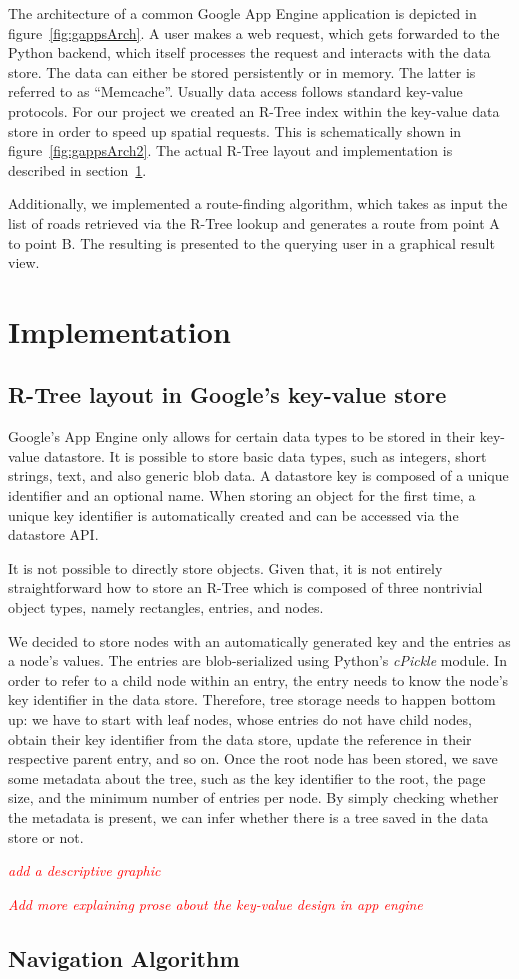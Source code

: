 \documentclass{scrartcl}
\newcommand{\TODO}[1]{\textcolor{red}{\boxed{\mathbf{TODO }} {\textit{#1}} }}
\begin{document}
The architecture of a common Google App Engine application is depicted in figure~\ref{fig:gappsArch}. A user makes a web request, which gets forwarded to the Python backend, which itself processes the request and interacts with the data store. The data can either be stored persistently or in memory. The latter is referred to as ``Memcache''. Usually data access follows standard key-value protocols. For our project we created an R-Tree index within the key-value data store in order to speed up spatial requests. This is schematically shown in figure~\ref{fig:gappsArch2}. The actual R-Tree layout and implementation is described in section~\ref{sec:implementation}.

Additionally, we implemented a route-finding algorithm, which takes as input the list of roads retrieved via the R-Tree lookup and generates a route from point A to point B. The resulting is presented to the querying user in a graphical result view.

\section{Implementation}
\label{sec:implementation}
\subsection{R-Tree layout in Google's key-value store}
Google's App Engine only allows for certain data types to be stored in their key-value datastore. It is possible to store basic data types, such as integers, short strings, text, and also generic blob data. A datastore key is composed of a unique identifier and an optional name. When storing an object for the first time, a unique key identifier is automatically created and can be accessed via the datastore API. 

It is not possible to directly store objects. Given that, it is not entirely straightforward how to store an R-Tree which is composed of three nontrivial object types, namely rectangles, entries, and nodes. 

We decided to store nodes with an automatically generated key and the entries as a node's values. The entries are blob-serialized using Python's \textit{cPickle} module. In order to refer to a child node within an entry, the entry needs to know the node's key identifier in the data store. Therefore, tree storage needs to happen bottom up: we have to start with leaf nodes, whose entries do not have child nodes, obtain their key identifier from the data store, update the reference in their respective parent entry, and so on. Once the root node has been stored, we save some metadata about the tree, such as the key identifier to the root, the page size, and the minimum number of entries per node. By simply checking whether the metadata is present, we can infer whether there is a tree saved in the data store or not.

\TODO{add a descriptive graphic}

\TODO{Add more explaining prose about the key-value design in app engine}

\subsection{Navigation Algorithm}



\end{document}
